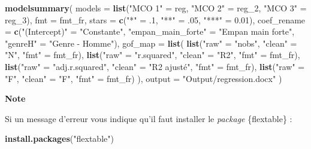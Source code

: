 \documentclass[
  11pt,
]{book}
\newenvironment{Shaded}{\begin{snugshade}}{\end{snugshade}}
\newcommand{\AttributeTok}[1]{\textcolor[rgb]{0.13,0.29,0.53}{#1}}
\newcommand{\DecValTok}[1]{\textcolor[rgb]{0.00,0.00,0.81}{#1}}
\newcommand{\FloatTok}[1]{\textcolor[rgb]{0.00,0.00,0.81}{#1}}
\newcommand{\FunctionTok}[1]{\textcolor[rgb]{0.13,0.29,0.53}{\textbf{#1}}}
\newcommand{\NormalTok}[1]{#1}
\newcommand{\OtherTok}[1]{\textcolor[rgb]{0.56,0.35,0.01}{#1}}
\newcommand{\StringTok}[1]{\textcolor[rgb]{0.31,0.60,0.02}{#1}}
\numberwithin{equation}{section}
\numberwithin{countremarque}{section}
\newenvironment{notebox}{
  \begin{tcolorbox}[breakable, colback=jaune,coltext=black,
                  colframe=grisfonce]}
 {\end{tcolorbox}}
\begin{document}
\begin{Shaded}
\begin{Highlighting}[]
\FunctionTok{modelsummary}\NormalTok{(}
  \AttributeTok{models =} \FunctionTok{list}\NormalTok{(}\StringTok{"MCO 1"} \OtherTok{=}\NormalTok{ reg,}
                \StringTok{"MCO 2"} \OtherTok{=}\NormalTok{ reg\_2,}
                \StringTok{"MCO 3"} \OtherTok{=}\NormalTok{ reg\_3),}
  \AttributeTok{fmt =}\NormalTok{ fmt\_fr,}
  \AttributeTok{stars =} \FunctionTok{c}\NormalTok{(}\StringTok{"*"} \OtherTok{=}\NormalTok{ .}\DecValTok{1}\NormalTok{, }\StringTok{"**"} \OtherTok{=}\NormalTok{ .}\DecValTok{05}\NormalTok{, }\StringTok{"***"} \OtherTok{=} \FloatTok{0.01}\NormalTok{),}
  \AttributeTok{coef\_rename =} \FunctionTok{c}\NormalTok{(}\StringTok{"(Intercept)"} \OtherTok{=} \StringTok{"Constante"}\NormalTok{,}
                  \StringTok{"empan\_main\_forte"} \OtherTok{=} \StringTok{"Empan main forte"}\NormalTok{,}
                  \StringTok{"genreH"} \OtherTok{=} \StringTok{"Genre {-} Homme"}\NormalTok{),}
  \AttributeTok{gof\_map =} \FunctionTok{list}\NormalTok{(}
    \FunctionTok{list}\NormalTok{(}\StringTok{"raw"} \OtherTok{=} \StringTok{"nobs"}\NormalTok{, }\StringTok{"clean"} \OtherTok{=} \StringTok{"N"}\NormalTok{, }\StringTok{"fmt"} \OtherTok{=}\NormalTok{ fmt\_fr),}
    \FunctionTok{list}\NormalTok{(}\StringTok{"raw"} \OtherTok{=} \StringTok{"r.squared"}\NormalTok{, }\StringTok{"clean"} \OtherTok{=} \StringTok{"R2"}\NormalTok{, }\StringTok{"fmt"} \OtherTok{=}\NormalTok{ fmt\_fr),}
    \FunctionTok{list}\NormalTok{(}\StringTok{"raw"} \OtherTok{=} \StringTok{"adj.r.squared"}\NormalTok{, }\StringTok{"clean"} \OtherTok{=} \StringTok{"R2 ajusté"}\NormalTok{, }\StringTok{"fmt"} \OtherTok{=}\NormalTok{ fmt\_fr),}
    \FunctionTok{list}\NormalTok{(}\StringTok{"raw"} \OtherTok{=} \StringTok{"F"}\NormalTok{, }\StringTok{"clean"} \OtherTok{=} \StringTok{"F"}\NormalTok{, }\StringTok{"fmt"} \OtherTok{=}\NormalTok{ fmt\_fr)}
\NormalTok{  ),}
  \AttributeTok{output =} \StringTok{"Output/regression.docx"}
\NormalTok{)}
\end{Highlighting}
\end{Shaded}

\begin{notebox}

\textbf{Note}

Si un message d'erreur vous indique qu'il faut installer le \emph{package} \{flextable\} :

\begin{Shaded}
\begin{Highlighting}[]
\FunctionTok{install.packages}\NormalTok{(}\StringTok{"flextable"}\NormalTok{)}
\end{Highlighting}
\end{Shaded}

\end{notebox}
\end{document}

